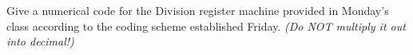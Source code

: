 \begin{problem}
  Give a numerical code for the Division register machine
  provided in Monday’s class according to the coding scheme
  established Friday.
  \emph{(Do NOT multiply it out into decimal!)}

  \begin{answer}
    
  \end{answer}
\end{problem}
